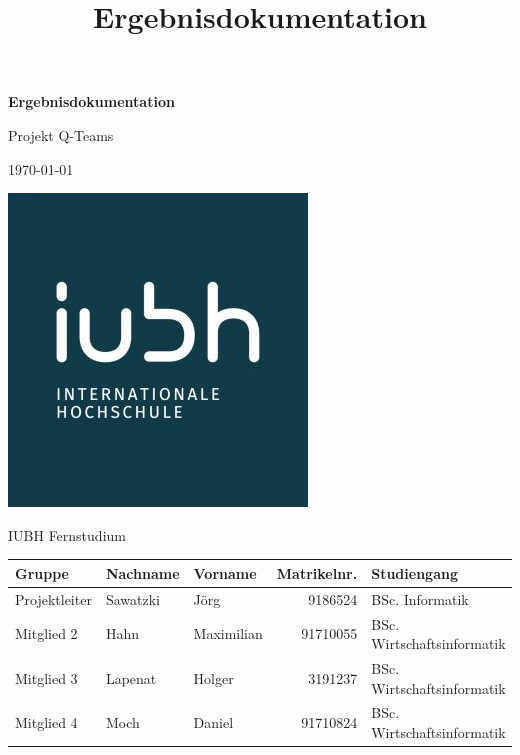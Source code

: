 \documentclass[a4paper,11pt,listof=numbered,glossary=totoc,parskip=half,toc=bib]{scrreprt}
\title{Ergebnisdokumentation}
\begin{document}
	\begin{titlepage}
		
		\centering
		\vspace*{2.5cm}
		{\large\bfseries \par}	
		{\Huge\bfseries Ergebnisdokumentation\par}
		{\Large\bfseries  \par}

		{\Large Projekt Q-Teams\par}
		{\large\today\par}
		\vspace{0.5cm}

			
		
		\includegraphics[scale=0.5]{iubh_logo}
		
		IUBH Fernstudium
		\vspace{0.5cm}
		
		\begin{tabular}{lllrl}
			\toprule
			\textbf{Gruppe} & \textbf{Nachname} & \textbf{Vorname} & \textbf{Matrikelnr.} & \textbf{Studiengang} \\
			\midrule
			Projektleiter & Sawatzki & Jörg & 9186524 & BSc. Informatik \\
			Mitglied 2 & Hahn & Maximilian & 91710055 & BSc. Wirtschaftsinformatik \\
			Mitglied 3 & Lapenat & Holger & 3191237 & BSc. Wirtschaftsinformatik \\
			Mitglied 4 & Moch & Daniel & 91710824 & BSc. Wirtschaftsinformatik \\
			\bottomrule
		\end{tabular}	
	\end{titlepage}
	
	
	\newpage
	\setcounter{tocdepth}{2}
	\tableofcontents	
	\renewcommand \thechapter{\Roman{chapter}}
	\listoffigures %
	\printglossaries
	\setcounter{lastRomanCounter}{\value{chapter}} %
	
\end{document}
